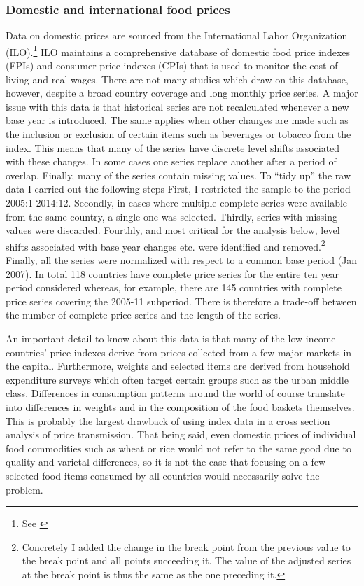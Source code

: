 \documentclass[12pt,english]{article}
\begin{document}
\subsubsection{Domestic and international food prices}
Data on domestic prices are sourced from the International Labor Organization (ILO).\footnote{See \citet{ilo16}} ILO maintains a comprehensive database of domestic food price indexes (FPIs) and consumer price indexes (CPIs) that is used to monitor the cost of living and real wages. There are not many studies which draw on this database, however, despite a broad country coverage and long monthly price series. A major issue with this data is that historical series are not recalculated whenever a new base year is introduced. The same applies when other changes are made such as the inclusion or exclusion of certain items such as beverages or tobacco from the index. This means that many of the series have discrete level shifts associated with these changes. In some cases one series replace another after a period of overlap. Finally, many of the series contain missing values. To ``tidy up'' the raw data I carried out the following steps First, I restricted the sample to the period 2005:1-2014:12. Secondly, in cases where multiple complete series were available from the same country, a single one was selected. Thirdly, series with missing values were discarded. Fourthly, and most critical for the analysis below, level shifts associated with base year changes etc. were identified and removed.\footnote{Concretely I added the change in the break point from the previous value to the break point and all points succeeding it. The value of the adjusted series at the break point is thus the same as the one preceding it.} Finally, all the series were normalized with respect to a common base period (Jan 2007). In total 118 countries have complete price series for the entire ten year period considered whereas, for example, there are 145 countries with complete price series covering the 2005-11 subperiod. There is therefore a trade-off between the number of complete price series and the length of the series.

An important detail to know about this data is that many of the low income countries' price indexes derive from prices collected from a few major markets in the capital. Furthermore, weights and selected items are derived from household expenditure surveys which often target certain groups such as the urban middle class. Differences in consumption patterns around the world of course translate into differences in weights and in the composition of the food baskets themselves. This is probably the largest drawback of using index data in a cross section analysis of price transmission. That being said, even domestic prices of individual food commodities such as wheat or rice would not refer to the same good due to quality and varietal differences, so it is not the case that focusing on a few selected food items consumed by all countries would necessarily solve the problem.
\end{document}
